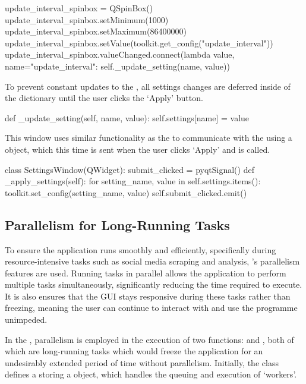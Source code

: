     \begin{python}
update_interval_spinbox = QSpinBox()
update_interval_spinbox.setMinimum(1000)
update_interval_spinbox.setMaximum(86400000)
update_interval_spinbox.setValue(toolkit.get_config("update_interval"))
update_interval_spinbox.valueChanged.connect(lambda value, name="update_interval": self._update_setting(name, value))
    \end{python}

    To prevent constant updates to the , all settings changes are deferred inside of the  dictionary until the user clicks the `Apply' button.

    \begin{python}
def _update_setting(self, name, value):
    self.settings[name] = value
    \end{python}

    This window uses similar functionality as the  to communicate with the  using a  object, which this time is sent when the user clicks `Apply' and  is called.

    \begin{python}
class SettingsWindow(QWidget):
    submit_clicked = pyqtSignal()
    def _apply_settings(self):
        for setting_name, value in self.settings.items():
            toolkit.set_config(setting_name, value)
        self.submit_clicked.emit()
    \end{python}

    \subsection{Parallelism for Long-Running Tasks}
    To ensure the application runs smoothly and efficiently, specifically during resource-intensive tasks such as social media scraping and analysis, 's parallelism features are used. Running tasks in parallel allows the application to perform multiple tasks simultaneously, significantly reducing the time required to execute. It is also ensures that the GUI stays responsive during these tasks rather than freezing, meaning the user can continue to interact with and use the programme unimpeded.

    In the , parallelism is employed in the execution of two functions:  and , both of which are long-running tasks which would freeze the application for an undesirably extended period of time without parallelism. Initially, the class defines a  storing a  object, which handles the queuing and execution of `workers'.

